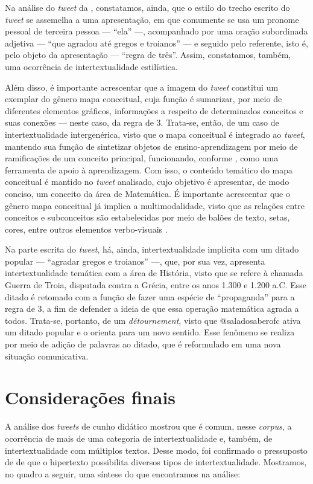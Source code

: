 \documentclass{textolivre}
\begin{document}
Na análise do \textit{tweet} da , constatamos, ainda, que o estilo do trecho escrito do \textit{tweet} se assemelha a uma apresentação, em que comumente se usa um pronome pessoal de terceira pessoa  — “ela” —, acompanhado por uma oração subordinada adjetiva — “que agradou até gregos e troianos” — e seguido pelo referente, isto é, pelo objeto da apresentação — “regra de três”. Assim, constatamos, também, uma ocorrência de intertextualidade estilística.

Além disso, é importante acrescentar que a imagem do \textit{tweet} constitui um exemplar do gênero mapa conceitual, cuja função é sumarizar, por meio de diferentes elementos gráficos, informações a respeito de determinados conceitos e suas conexões \cite{sturm_o_2019} — neste caso, da regra de 3. Trata-se, então, de um caso de intertextualidade intergenérica, visto que o mapa conceitual é integrado ao \textit{tweet}, mantendo sua função de sintetizar objetos de ensino-aprendizagem por meio de ramificações de um conceito principal, funcionando, conforme \textcite{sturm_o_2019}, como uma ferramenta de apoio à aprendizagem. Com isso, o conteúdo temático do mapa conceitual é mantido no \textit{tweet} analisado, cujo objetivo é apresentar, de modo conciso, um conceito da área de Matemática. É importante acrescentar que o gênero mapa conceitual já implica a multimodalidade, visto que as relações entre conceitos e subconceitos são estabelecidas por meio de balões de texto, setas, cores, entre outros elementos verbo-visuais \cite{sturm_o_2019}.

Na parte escrita do \textit{tweet}, há, ainda, intertextualidade implícita com um ditado popular — “agradar gregos e troianos” —, que, por sua vez, apresenta intertextualidade temática com a área de História, visto que se refere à chamada Guerra de Troia, disputada contra a Grécia, entre os anos 1.300 e 1.200 a.C. Esse ditado é retomado com a função de fazer uma espécie de “propaganda” para a regra de 3, a fim de defender a ideia de que essa operação matemática agrada a todos. Trata-se, portanto, de um \textit{détournement}, visto que @saladosaberofc ativa um ditado popular e o orienta para um novo sentido. Esse fenômeno se realiza por meio de adição de palavras ao ditado, que é reformulado em uma nova situação comunicativa.

\section{Considerações finais}\label{sec-formato}
A análise dos \textit{tweets} de cunho didático mostrou que é comum, nesse \textit{corpus}, a ocorrência de mais de uma categoria de intertextualidade e, também, de intertextualidade com múltiplos textos. Desse modo, foi confirmado o pressuposto de \textcite{araujo_consideracoes_2009} de que o hipertexto possibilita diversos tipos de intertextualidade. Mostramos, no quadro a seguir, uma síntese do que encontramos na análise:
\end{document}
